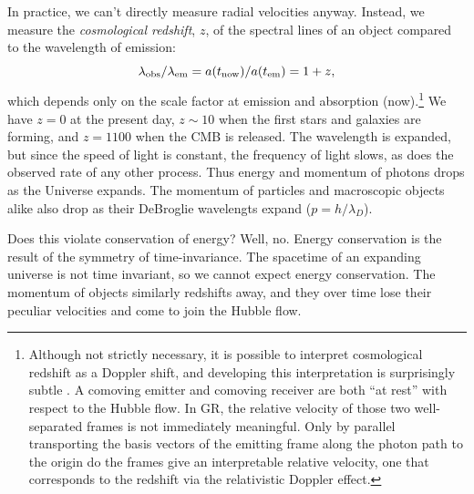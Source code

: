 In practice, we can't directly measure radial velocities anyway.  Instead, we measure the \textit{cosmological redshift}, $z$, of the spectral lines of an object compared to the wavelength of emission:
\begin{equation} 
  \lambda_{\rm obs}/\lambda_{\rm em} = a(t_{\rm now}) / a(t_{\rm em}) = 1+z,
\end{equation}
which depends only on the scale factor at emission and absorption (now).\footnote{Although not strictly necessary, it is possible to interpret cosmological redshift as a Doppler shift, and developing this interpretation is surprisingly subtle \citep{2009AmJPh..77..688B}.  A comoving emitter and comoving receiver are both ``at rest'' with respect to the Hubble flow.  In GR, the relative velocity of those two well-separated frames is not immediately meaningful.  Only by parallel transporting the basis vectors of the emitting frame along the photon path to the origin do the frames give an interpretable relative velocity, one that corresponds to the redshift via the relativistic Doppler effect.}
We have $z=0$ at the present day, $z \sim 10$ when the first stars and galaxies are forming, and $z =1100$ when the CMB is released.  The wavelength is expanded, but since the speed of light is constant, the frequency of light slows, as does the observed rate of any other process.  Thus energy and momentum of photons drops as the Universe expands.  The momentum of particles and macroscopic objects alike also drop as their DeBroglie wavelengts expand ($p = h/\lambda_D$).

Does this violate conservation of energy?  Well, no.  Energy conservation is the result of the symmetry of time-invariance.  The spacetime of an expanding universe is not time invariant, so we cannot expect energy conservation.  The momentum of objects similarly redshifts away, and they over time lose their peculiar velocities and come to join the Hubble flow.

